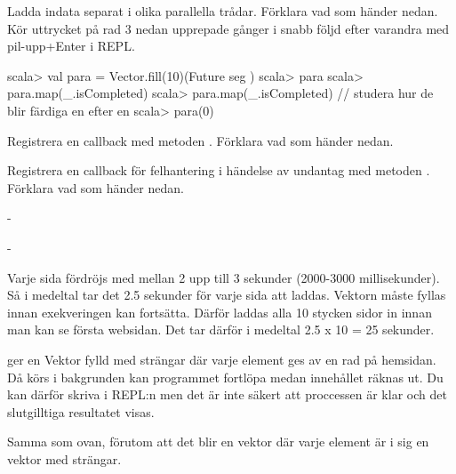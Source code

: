 \Subtask Ladda indata separat i olika parallella trådar. Förklara vad som händer nedan. Kör uttrycket på rad 3 nedan upprepade gånger i snabb följd efter varandra med pil-upp+Enter i REPL.
\begin{REPL}
scala> val para = Vector.fill(10)(Future{ seg })
scala> para
scala> para.map(_.isCompleted)
scala> para.map(_.isCompleted) // studera hur de blir färdiga en efter en
scala> para(0)
\end{REPL}

\Subtask Registrera en callback med metoden . Förklara vad som händer nedan.


\Subtask Registrera en callback för felhantering i händelse av undantag med metoden . Förklara vad som händer nedan.



\SOLUTION


\TaskSolved \what

\SubtaskSolved  -

\SubtaskSolved  -

\SubtaskSolved  Varje sida fördröjs med mellan 2 upp till 3 sekunder (2000-3000 millisekunder). Så i medeltal tar det 2.5 sekunder för varje sida att laddas. Vektorn måste fyllas innan exekveringen kan fortsätta. Därför laddas alla 10 stycken sidor in innan man kan se första websidan. Det tar därför i medeltal 2.5 x 10 = 25 sekunder.

\SubtaskSolved  {} ger en Vektor fylld med strängar där varje element ges av en rad på hemsidan. Då  körs i bakgrunden kan programmet fortlöpa medan innehållet räknas ut. Du kan därför skriva  i REPL:n men det är inte säkert att proccessen är klar och det slutgilltiga resultatet visas.

\SubtaskSolved  Samma som ovan, förutom att det blir en vektor där varje element är i sig en vektor med strängar.

